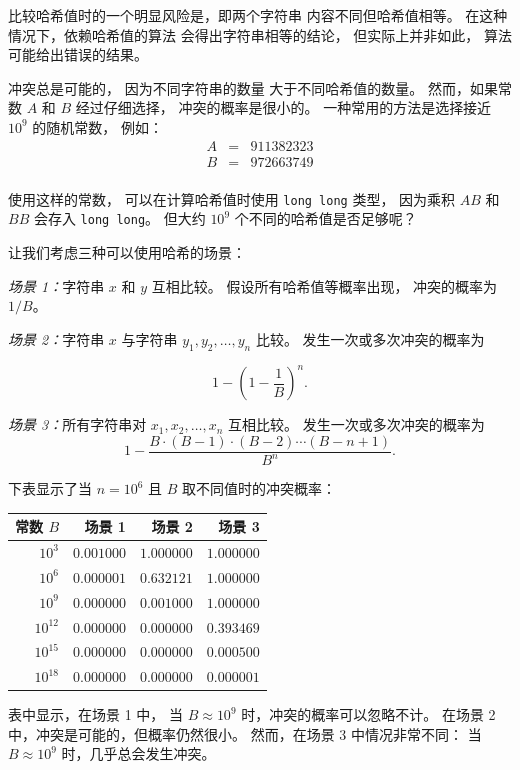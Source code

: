 
比较哈希值时的一个明显风险是，即两个字符串
内容不同但哈希值相等。
在这种情况下，依赖哈希值的算法
会得出字符串相等的结论，
但实际上并非如此，
算法可能给出错误的结果。

冲突总是可能的，
因为不同字符串的数量
大于不同哈希值的数量。
然而，如果常数 $A$ 和 $B$ 经过仔细选择，
冲突的概率是很小的。
一种常用的方法是选择接近 $10^9$ 的随机常数，
例如：
\[
\begin{array}{lcl}
A & = & 911382323 \\
B & = & 972663749 \\
\end{array}
\]

使用这样的常数，
可以在计算哈希值时使用
\texttt{long long} 类型，
因为乘积 $AB$ 和 $BB$ 会存入 \texttt{long long}。
但大约 $10^9$ 个不同的哈希值是否足够呢？

让我们考虑三种可以使用哈希的场景：

\textit{场景 1：}字符串 $x$ 和 $y$ 互相比较。
假设所有哈希值等概率出现，
冲突的概率为 $1/B$。

\textit{场景 2：}字符串 $x$ 与字符串
$y_1,y_2,\ldots,y_n$ 比较。
发生一次或多次冲突的概率为

\[1-(1-\frac{1}{B})^n.\]

\textit{场景 3：}所有字符串对 $x_1,x_2,\ldots,x_n$
互相比较。
发生一次或多次冲突的概率为
\[ 1 - \frac{B \cdot (B-1) \cdot (B-2) \cdots (B-n+1)}{B^n}.\]

下表显示了当 $n=10^6$ 且 $B$ 取不同值时的冲突概率：

\begin{center}
\begin{tabular}{rrrr}
常数 $B$ & 场景 1 & 场景 2 & 场景 3 \\
\hline
$10^3$ & $0.001000$ & $1.000000$ & $1.000000$ \\
$10^6$ & $0.000001$ & $0.632121$ & $1.000000$ \\
$10^9$ & $0.000000$ & $0.001000$ & $1.000000$ \\
$10^{12}$ & $0.000000$ & $0.000000$ & $0.393469$ \\
$10^{15}$ & $0.000000$ & $0.000000$ & $0.000500$ \\
$10^{18}$ & $0.000000$ & $0.000000$ & $0.000001$ \\
\end{tabular}
\end{center}

表中显示，在场景 1 中，
当 $B \approx 10^9$ 时，冲突的概率可以忽略不计。
在场景 2 中，冲突是可能的，但概率仍然很小。
然而，在场景 3 中情况非常不同：
当 $B \approx 10^9$ 时，几乎总会发生冲突。

